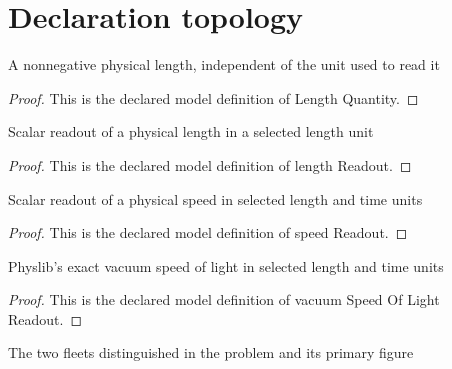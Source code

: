 \section{Declaration topology}
\begin{definition}
  \label{def:physics:phyx-mini-0513:phyxminiproblems-problemphyxmini0513-lengthquantity}
  A nonnegative physical length, independent of the unit used to read it
\end{definition}
\begin{proof}
  This is the declared model definition of Length Quantity.
\end{proof}
\begin{definition}
  \label{def:physics:phyx-mini-0513:phyxminiproblems-problemphyxmini0513-lengthreadout}
  Scalar readout of a physical length in a selected length unit
\end{definition}
\begin{proof}
  This is the declared model definition of length Readout.
\end{proof}
\begin{definition}
  \label{def:physics:phyx-mini-0513:phyxminiproblems-problemphyxmini0513-speedreadout}
  Scalar readout of a physical speed in selected length and time units
\end{definition}
\begin{proof}
  This is the declared model definition of speed Readout.
\end{proof}
\begin{definition}
  \label{def:physics:phyx-mini-0513:phyxminiproblems-problemphyxmini0513-vacuumspeedoflightreadout}
  Physlib's exact vacuum speed of light in selected length and time units
\end{definition}
\begin{proof}
  This is the declared model definition of vacuum Speed Of Light Readout.
\end{proof}
\begin{definition}
  \label{def:physics:phyx-mini-0513:phyxminiproblems-problemphyxmini0513-starshipfaction}
  The two fleets distinguished in the problem and its primary figure
\end{definition}
